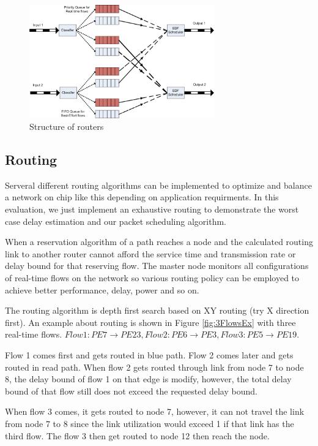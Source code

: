 \documentclass[conference, twocolumn]{IEEEtran}
\theoremstyle{definition}
\begin{document}
\begin{figure}[htp]
\centering
\includegraphics[width=8cm]{pics/Router.png}
\caption[Other Spec.]
{Structure of routers}\label{fig:RouterStructure}
\end{figure}

\subsection{Routing}

Serveral different routing algorithms can be implemented to optimize and balance
a network on chip like this depending on application requirments. In this
evaluation, we just implement an exhaustive routing to demonstrate the
worst case delay estimation and our packet scheduling algorithm.

When a reservation algorithm of a path reaches a node and the calculated routing
link to another router cannot afford the service time and transmission rate or delay 
bound for that reserving flow. The master node monitors all configurations of
real-time flows on the network so various routing policy can be employed to
achieve better performance, delay, power and so on.

The routing algorithm is depth first search based on XY routing (try X
direction first). An example about routing is shown in Figure
\ref{fig:3FlowsEx} with three real-time flows. $Flow 1: PE7 \rightarrow
PE23, Flow 2: PE6 \rightarrow PE3, Flow 3: PE5 \rightarrow PE19$.

Flow 1 comes first and gets routed in blue path. Flow 2 comes later and gets
routed in read path.  When flow 2 gets routed through link from node 7 to node
8, the delay bound of flow 1 on that edge is modify, however, the total delay
bound of that flow still does not exceed the requested delay bound.

When flow 3 comes, it gets routed to node 7, however, it can not travel the
link from node 7 to 8 since the link utilization would exceed 1 if that link
has the third flow. The flow 3 then get routed to node 12 then reach the node.
\end{document}

